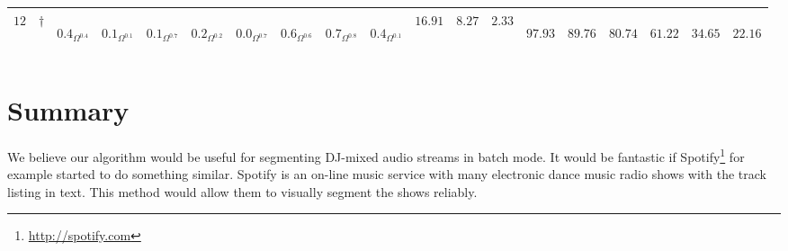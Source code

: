 \documentclass[twocolumn]{article}
\begin{document}
\begin{table}[t]
\begin{tabular}{|l|l|llllllll|lll|llllll|}
		\hline 
$12$ &	$\dagger$	&\begin{sideways}$0.4_{\Omega^{0.4}}$\end{sideways}&\begin{sideways}$0.1_{\Omega^{0.1}}$\end{sideways}&\begin{sideways}$0.1_{\Omega^{0.7}}$\end{sideways}&\begin{sideways}$0.2_{\Omega^{0.2}}$\end{sideways}&\begin{sideways}$0.0_{\Omega^{0.7}}$\end{sideways}&\begin{sideways}$0.6_{\Omega^{0.6}}$\end{sideways}&\begin{sideways}$0.7_{\Omega^{0.8}}$\end{sideways}&\begin{sideways}$0.4_{\Omega^{0.1}}$\end{sideways}&$16.91 $&$ 8.27 $& $ 2.33 $& \begin{sideways}$97.93$\end{sideways}& \begin{sideways}$89.76$\end{sideways}&\begin{sideways}$ 80.74$\end{sideways}&\begin{sideways}$ 61.22$\end{sideways}& \begin{sideways}$34.65$ \end{sideways}& \begin{sideways}$22.16$\end{sideways} \\
		
		
				\hline 
	\end{tabular}
	
	\label{tab:results}
\end{table}


\section{Summary}\label{conclusions}

We believe our algorithm would be useful for segmenting DJ-mixed audio streams in batch mode. It would be fantastic if Spotify\footnote{\url{http://spotify.com}} for example started to do something similar. Spotify is an on-line music service with many electronic dance music radio shows with the track listing in text. This method would allow them to visually segment the shows reliably. 
\end{document}
